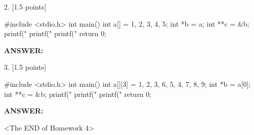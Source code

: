 \documentclass[12pt]{article}
\def \HWNumber {4}
\newenvironment{answerbox}{\par\begin{mdframed}[linewidth=1pt,linecolor=Black]%
		\begin{list}{}{\leftmargin=0.5cm}\item[\Large\bcplume]}
		{\end{list}\end{mdframed}\par}
\newenvironment{codeblock}{\VerbatimEnvironment\begin{c99*}{}}{\end{c99*}} %
\newcommand{\answer}[2]{
	
	\begin{answerbox}
		\textbf{ANSWER:} 
		
		\ifthenelse{\equal{#2}{}}{\vspace{#1}}{#2}
	\end{answerbox}
	
}
\begin{document}
2. [1.5 points]
\begin{codeblock}
#include <stdio.h>
int main() {
  int a[] = {1, 2, 3, 4, 5};
  int *b = a; int **c = &b;
  printf("%
  printf("%
  printf("%
  return 0;  
}
\end{codeblock}
\answer{3.8cm}{%
}

3. [1.5 points]
\begin{codeblock}
#include <stdio.h>
int main() {
  int a[][3] = {{1, 2, 3}, {6, 5, 4}, {7, 8, 9}};
  int *b = a[0]; int **c = &b;
  printf("%
  printf("%
  printf("%
  return 0;  
}
\end{codeblock}
\answer{3.8cm}{%
}

\begin{center}
	\vspace{1cm}
	\large \textless The END of Homework \HWNumber\textgreater
\end{center}
	
\end{document}
